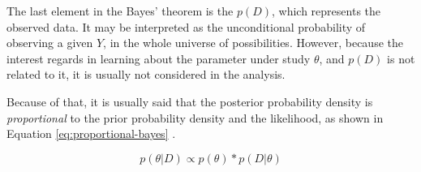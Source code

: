
The last element in the Bayes' theorem is the $p(D)$, which represents the observed data. It may be interpreted as the unconditional probability of observing a given $Y$, in the whole universe of possibilities. However, because the interest regards in learning about the parameter under study $\theta$, and $p(D)$ is not related to it, it is usually not considered in the analysis. 

Because of that, it is usually said that the posterior probability density is \textit{proportional} to the prior probability density and the likelihood, as shown in Equation \ref{eq:proportional-bayes} \citep{koop2003}. 

\begin{equation}
\label{eq:proportional-bayes}
p(\theta \vert D) \propto p(\theta) * p(D \vert \theta)
\end{equation}







